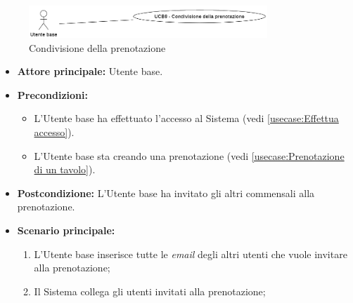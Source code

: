 \label{usecase:Condivisione della prenotazione}

\begin{figure}[h]
	\centering
	\includegraphics[width=0.8\textwidth]{./uml/UCB9.png} 
	\caption{Condivisione della prenotazione}
	\label{fig:UCB9}
  \end{figure}

\begin{itemize}
	\item \textbf{Attore principale:} Utente base.

	\item \textbf{Precondizioni:}
	\begin{itemize}
		\item L'Utente base ha effettuato l'accesso al Sistema (vedi \autoref{usecase:Effettua accesso}).
		\item L'Utente base sta creando una prenotazione (vedi \autoref{usecase:Prenotazione di un tavolo}).
	\end{itemize}

	\item \textbf{Postcondizione:}
	      L'Utente base ha invitato gli altri commensali alla prenotazione.

	\item \textbf{Scenario principale:}
	      \begin{enumerate}
		      \item L'Utente base inserisce tutte le \textit{email} degli altri utenti che vuole invitare alla prenotazione;
		      \item Il Sistema collega gli utenti invitati alla prenotazione;
	      \end{enumerate}
\end{itemize}
